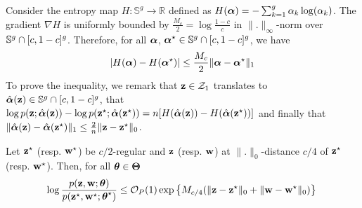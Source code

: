 \proofbegin
Consider the entropy map $H: \mathbb{S}^{g} \to \mathbb{R}$ 
defined as $H(\boldsymbol{\alpha}) = - \sum_{k = 1}^{g} \alpha_k \log(\alpha_k)$. The gradient $\nabla H$ is uniformly bounded by $\frac{M_c}{2} = \log \frac{1-c}{c}$ in $\|.\|_{\infty}$-norm over $\mathbb{S}^{g} \cap [c, 1-c]^g$. 
Therefore, for all $\boldsymbol{\alpha}$, $\boldsymbol{\alpha}^\star \in \mathbb{S}^{g} \cap [c, 1-c]^g$, we have 
\begin{equation*}
| H(\bpi) - H(\bpis) | \leq \frac{M_c}{2} \| \bpi -\bpis \|_1
\end{equation*}
To prove the  inequality, we remark that $\mathbf{z} \in \mathcal{Z}_1$ translates to $\hat{\boldsymbol{\alpha}}(\mathbf{z}) \in \mathbb{S}^{g} \cap [c, 1-c]^g$, 
that $\log p(\mathbf{z}; \hat{\boldsymbol{\alpha}}(\mathbf{z})) - \log p(\mathbf{z}^\star; \hat{\boldsymbol{\alpha}}(\mathbf{z}^\star)) = n [ H(\hat{\boldsymbol{\alpha}}(\mathbf{z})) - H(\hat{\boldsymbol{\alpha}}(\mathbf{z}^\star)) ]$ 
and finally that $\|\hat{\boldsymbol{\alpha}}(\mathbf{z}) - \hat{\boldsymbol{\alpha}}(\mathbf{z}^\star) \|_1 \leq \frac{2}{n} \| \mathbf{z} - \mathbf{z}^\star \|_0$. 
\proofend


\begin{corollaire}\label{cor:marginalprobabilties}\textbf{}
Let $\mathbf{z}^\star$ (resp. $\mathbf{w}^\star$) be $c/2$-regular and $\mathbf{z}$ (resp. $\mathbf{w}$) at $\|.\|_0$-distance $c/4$ of $\mathbf{z}^\star$ (resp. $\mathbf{w}^\star$). Then, for all $\boldsymbol{\theta} \in \boldsymbol{\Theta}$
\begin{equation*}
\log \frac{\prob(\bz, \bw; \btheta)}{\prob(\bzs, \bws; \bthetas)} \leq \bigO_P(1) \exp \left\{ M_{c/4} ( \|\bz - \bzs \|_0 + \|\bw - \bws \|_0 ) \right\} \\ 
\end{equation*}
\end{corollaire}

